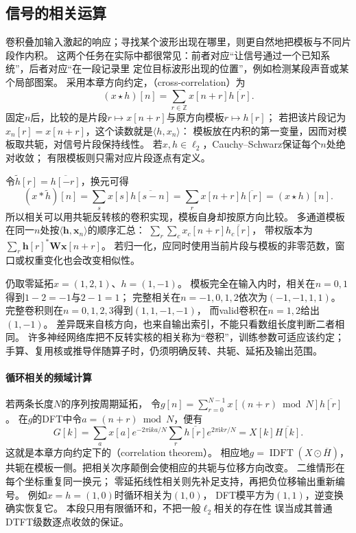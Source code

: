 \subsection{信号的相关运算}
\label{sec:signal-template-correlation}

卷积叠加输入激起的响应；寻找某个波形出现在哪里，则更自然地把模板与不同片段作内积。
这两个任务在实际中都很常见：前者对应“让信号通过一个已知系统”，后者对应“在一段记录里
定位目标波形出现的位置”，例如检测某段声音或某个局部图案。
采用本章方向约定，（cross-correlation）为
\begin{equation}
  (x\star h)[n]=\sum_{r\in\mathbb Z}x[n+r]\overline{h[r]}.
  \label{eq:signal-analysis-cross-correlation}
\end{equation}
固定$n$后，比较的是片段$r\mapsto x[n+r]$与原方向模板$r\mapsto h[r]$；
若把该片段记为$x_n[r]=x[n+r]$，这个读数就是$\langle h,x_n\rangle$：
模板放在内积的第一变量，因而对模板取共轭，对信号片段保持线性。
若$x,h\in\ell_2$，Cauchy--Schwarz保证每个$n$处绝对收敛；
有限模板则只需对应片段逐点有定义。

令$\widetilde h[r]=\overline{h[-r]}$，换元可得
\[
  (x*\widetilde h)[n]=\sum_s x[s]\overline{h[s-n]}
  =\sum_r x[n+r]\overline{h[r]}=(x\star h)[n].
\]
所以相关可以用共轭反转核的卷积实现，模板自身却按原方向比较。
多通道模板在同一$n$处按$\langle\bm h,\bm x_n\rangle$的顺序汇总：
$\sum_r\sum_c x_c[n+r]\overline{h_c[r]}$，
带权版本为$\sum_r\bm h[r]^*\bm W\bm x[n+r]$。
若归一化，应同时使用当前片段与模板的非零范数，窗口或权重变化也会改变相似性。

仍取零延拓$x=(1,2,1)$、$h=(1,-1)$。
模板完全在输入内时，相关在$n=0,1$得到$1-2=-1$与$2-1=1$；
完整相关在$n=-1,0,1,2$依次为$(-1,-1,1,1)$。
完整卷积则在$n=0,1,2,3$得到$(1,1,-1,-1)$，
而valid卷积在$n=1,2$给出$(1,-1)$。
差异既来自核方向，也来自输出索引，不能只看数组长度判断二者相同。
许多神经网络库把不反转实核的相关称为“卷积”，训练参数可适应该约定；
手算、复用核或推导伴随算子时，仍须明确反转、共轭、延拓及输出范围。

\paragraph{循环相关的频域计算}
若两条长度$N$的序列按周期延拓，
令$g[n]=\sum_{r=0}^{N-1}x[(n+r)\bmod N]\overline{h[r]}$。
在$g$的DFT中令$a=(n+r)\bmod N$，便有
\[
 G[k]=\sum_a x[a]e^{-2\pi\mathrm i ka/N}
       \sum_r\overline{h[r]}e^{2\pi\mathrm i kr/N}
     =X[k]\overline{H[k]} .
\]
这就是本章方向约定下的（correlation theorem）。
相应地$g=\operatorname{IDFT}(X\odot\overline H)$，
共轭在模板一侧。把相关次序颠倒会使相应的共轭与位移方向改变。
二维情形在每个坐标重复同一换元；
零延拓线性相关则先补足支持，再把负位移输出重新编号。
例如$x=h=(1,0)$时循环相关为$(1,0)$，
DFT模平方为$(1,1)$，逆变换确实恢复它。
本段只用有限循环和，不把一般$\ell_2$相关的存在性
误当成其普通DTFT级数逐点收敛的保证。

